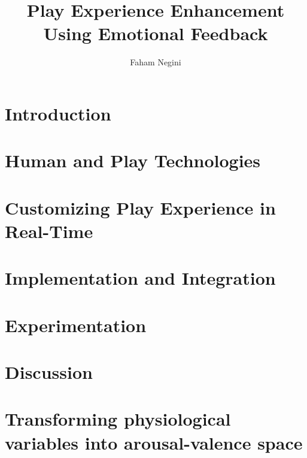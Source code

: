 \documentclass{uofsthesis-cs}
\title{Play Experience Enhancement Using Emotional Feedback}
\author{Faham Negini}
\begin{document}
\maketitle

\frontmatter



\chapter{Introduction}                             \label{chap:intro}      
\chapter{Human and Play Technologies}              \label{chap:man-n-play} 
\chapter{Customizing Play Experience in Real-Time} \label{chap:custmz}     
\chapter{Implementation and Integration}           \label{chap:impl}       
\chapter{Experimentation}                          \label{chap:exprm}      
\chapter{Discussion}                               \label{chap:discus}     




\uofsappendix
\chapter{Transforming physiological variables into arousal-valence space} \label{app:phys-to-av}    
\end{document}
